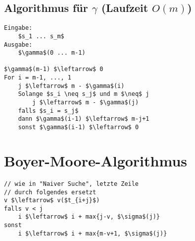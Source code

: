 \documentclass[8pt, DIV15, twocolumn]{scrartcl}
\begin{document}
\subsection*{Algorithmus für $\gamma$ (Laufzeit $O\left(m\right)$)}

\begin{lstlisting}[mathescape=true]
Eingabe:
	$s_1 ... s_m$
Ausgabe:
	$\gamma$(0 ... m-1)

$\gamma$(m-1) $\leftarrow$ 0
For i = m-1, ..., 1
	j $\leftarrow$ m - $\gamma$(i)
	Solange $s_i \neq s_j$ und m $\neq$ j
		j $\leftarrow$ m - $\gamma$(j)
	falls $s_i = s_j$
	dann $\gamma$(i-1) $\leftarrow$ m-j+1
	sonst $\gamma$(i-1) $\leftarrow$ 0
\end{lstlisting}

\section*{Boyer-Moore-Algorithmus}

\begin{lstlisting}[mathescape=true]
// wie in "Naiver Suche", letzte Zeile
// durch folgendes ersetzt
v $\leftarrow$ v($t_{i+j}$)
falls v < j
	i $\leftarrow$ i + max{j-v, $\sigma$(j)}
sonst
	i $\leftarrow$ i + max{m-v+1, $\sigma$(j)}
\end{lstlisting}
\end{document}

